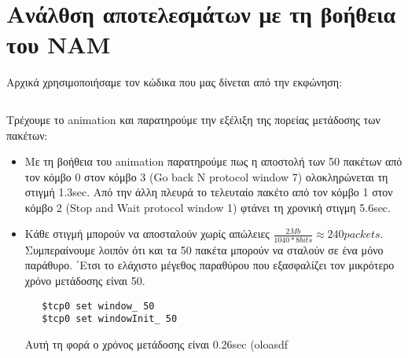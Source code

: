 \documentclass[a4paper,9pt]{article}
\begin{document}
\def\thesection {\Roman{section}.}



\section*{Aνάλθση αποτελεσμάτων με τη βοήθεια του NAM}
Αρχικά χρησιμοποιήσαμε τον κώδικα που μας δίνεται από την εκφώνηση:

\inputminted[fontsize=\footnotesize]{tcl}{files/ex4_1.tcl}

Τρέχουμε το animation και παρατηρούμε την εξέλιξη της πορείας μετάδοσης των
πακέτων:
\begin{itemize}
    \item Με τη βοήθεια του animation παρατηρούμε πως η αποστολή των 50
    πακέτων από τον κόμβο 0 στον κόμβο 3 (Go back N protocol window 7) ολοκληρώνεται τη
    στιγμή 1.3sec. Από την άλλη πλευρά το τελευταίο πακέτο από τον κόμβο 1
    στον κόμβο 2 (Stop and Wait protocol window 1) φτάνει τη χρονική στιγμη
    5.6sec.
    \item Κάθε στιγμή μπορούν να αποσταλούν χωρίς απώλειες
    $\frac{2Mb}{1040*8bits}\approx240packets$.  Συμπεραίνουμε λοιπόν ότι και
    τα 50 πακέτα μπορούν να σταλούν σε ένα μόνο παράθυρο. ΄Ετσι το ελάχιστο μέγεθος παραθύρου που εξασφαλίζει τον
   μικρότερο χρόνο μετάδοσης είναι 50.
   \begin{verbatim}
   $tcp0 set window_ 50
   $tcp0 set windowInit_ 50
   \end{verbatim}
   Αυτή τη φορά ο χρόνος μετάδοσης είναι 0.26sec (oloasdf

\end{itemize}
\end{document}

